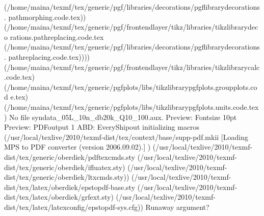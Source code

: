 (/home/maina/texmf/tex/generic/pgf/libraries/decorations/pgflibrarydecorations.
pathmorphing.code.tex))
(/home/maina/texmf/tex/generic/pgf/frontendlayer/tikz/libraries/tikzlibrarydeco
rations.pathreplacing.code.tex
(/home/maina/texmf/tex/generic/pgf/libraries/decorations/pgflibrarydecorations.
pathreplacing.code.tex))))
(/home/maina/texmf/tex/generic/pgf/frontendlayer/tikz/libraries/tikzlibrarycalc
.code.tex)
(/home/maina/texmf/tex/generic/pgfplots/libs/tikzlibrarypgfplots.groupplots.cod
e.tex)
(/home/maina/texmf/tex/generic/pgfplots/libs/tikzlibrarypgfplots.units.code.tex
)
No file syndata_05L_10n_db20k_Q10_100.aux.
Preview: Fontsize 10pt
Preview: PDFoutput 1
ABD: EveryShipout initializing macros
(/usr/local/texlive/2010/texmf-dist/tex/context/base/supp-pdf.mkii
[Loading MPS to PDF converter (version 2006.09.02).]
) (/usr/local/texlive/2010/texmf-dist/tex/generic/oberdiek/pdftexcmds.sty
(/usr/local/texlive/2010/texmf-dist/tex/generic/oberdiek/ifluatex.sty)
(/usr/local/texlive/2010/texmf-dist/tex/generic/oberdiek/ltxcmds.sty))
(/usr/local/texlive/2010/texmf-dist/tex/latex/oberdiek/epstopdf-base.sty
(/usr/local/texlive/2010/texmf-dist/tex/latex/oberdiek/grfext.sty)
(/usr/local/texlive/2010/texmf-dist/tex/latex/latexconfig/epstopdf-sys.cfg))
Runaway argument?
